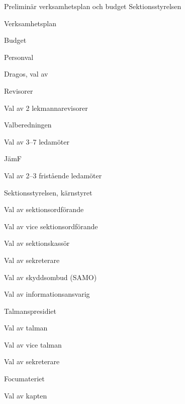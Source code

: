 \documentclass[prelim]{sektionsmote}
\begin{document}
\begin{ootd}
\item{Preliminär verksamhetsplan och budget Sektionsstyrelsen}
\begin{ootd}
  \item Verksamhetsplan
  \item Budget
\end{ootd}


\item{Personval}
\begin{ootd}
    \item Dragos, val av
    \item Revisorer
    \begin{ootd}
        \item Val av 2 lekmannarevisorer
    \end{ootd}
    \item Valberedningen
    \begin{ootd}
        \item Val av 3--7 ledamöter
    \end{ootd}
    \item JämF
    \begin{ootd}
        \item Val av 2--3 fristående ledamöter
    \end{ootd}
    \item Sektionsstyrelsen, kärnstyret
    \begin{ootd}
        \item Val av sektionsordförande
        \item Val av vice sektionsordförande
        \item Val av sektionskassör
        \item Val av sekreterare
        \item Val av skyddsombud (SAMO)
        \item Val av informationsansvarig
    \end{ootd}
    \item Talmanspresidiet
    \begin{ootd}
        \item Val av talman
        \item Val av vice talman
        \item Val av sekreterare
    \end{ootd}
    \item Focumateriet
    \begin{ootd}
        \item Val av kapten

\end{ootd}
\end{ootd}
\end{ootd}
\end{document}
